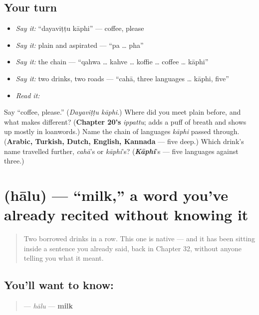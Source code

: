 \subsection*{Your turn}
\begin{itemize}
\raggedright
  \item \emph{Say it:} \textquotedblleft{}dayaviṭṭu kāphi\textquotedblright{} — coffee, please
  \item \emph{Say it:} plain and aspirated — \textquotedblleft{}pa … pha\textquotedblright{}
  \item \emph{Say it:} the chain — \textquotedblleft{}qahwa … kahve … koffie … coffee … kāphi\textquotedblright{}
  \item \emph{Say it:} two drinks, two roads — \textquotedblleft{}cahā, three languages … kāphi, five\textquotedblright{}
  \item \emph{Read it:} \textbf{}
\end{itemize}

\begin{tcolorbox}[breakable,colback=teal!4,colframe=teal!35!black,title={Before you move on}]
Say \textquotedblleft{}coffee, please.\textquotedblright{} (\emph{Dayaviṭṭu kāphi}.) Where did you meet plain \textbf{} before, and what makes \textbf{} different? (\textbf{Chapter 20's} \emph{ippattu}; \textbf{} adds a puff of breath and shows up mostly in loanwords.) Name the chain of languages \emph{kāphi} passed through. (\textbf{Arabic, Turkish, Dutch, English, Kannada} — five deep.) Which drink's name travelled further, \emph{cahā}'s or \emph{kāphi}'s? (\emph{\textbf{Kāphi}}'s — five languages against three.)
\end{tcolorbox}
\section[\texorpdfstring{\kn{ಹಾಲು} (hālu)}{ಹಾಲು (hālu)}]{ (hālu) — \textquotedblleft{}milk,\textquotedblright{} a word you've already recited without knowing it}

\label{lesson:KA-C39-haalu}



\begin{quote}
Two borrowed drinks in a row. This one is native — and it has been sitting inside a sentence you already said, back in Chapter 32, without anyone telling you what it meant.
\end{quote}

\subsection*{You'll want to know: }
\begin{quote}
\textbf{} — \emph{hālu} — \textbf{milk}
\end{quote}


